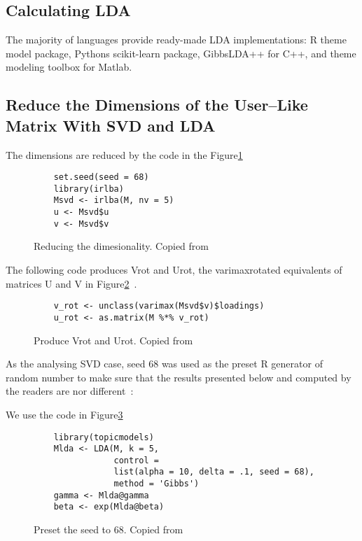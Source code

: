 \subsection{Calculating LDA~\cite{hid515-12}}

The majority of languages provide ready-made LDA implementations: 
R theme model package, Pythons scikit-learn package, 
GibbsLDA++ for C++, and theme modeling toolbox for Matlab.

\subsection{Reduce the Dimensions of the
User–Like Matrix With SVD and LDA~\cite{hid515-12}}

The dimensions are reduced by the code in the Figure\ref{F:reduce}

\begin{figure}[htb]
\begin{footnotesize}
\begin{verbatim}
    set.seed(seed = 68)
    library(irlba)
    Msvd <- irlba(M, nv = 5)
    u <- Msvd$u
    v <- Msvd$v
\end{verbatim}
\end{footnotesize}
\caption{Reducing the dimesionality. Copied from~\cite{hid515-12}}
\label{F:reduce}
\end{figure}


The following code produces Vrot and Urot, the varimaxrotated
equivalents of matrices U and V in Figure\ref{F:produce}~\cite{hid515-12}.

\begin{figure}[htb]
\begin{footnotesize}
\begin{verbatim}
    v_rot <- unclass(varimax(Msvd$v)$loadings)
    u_rot <- as.matrix(M %*% v_rot)
\end{verbatim}
\end{footnotesize}
\caption{Produce Vrot and Urot. Copied from~\cite{hid515-12}}
\label{F:produce}
\end{figure}


As the analysing SVD case, seed 68 was used as the preset
 R generator of random number to make sure that the results 
presented below and computed by the readers are nor 
different~\cite{hid515-12}:

We use the code in Figure\ref{F:setting68}

\begin{figure}[htb]
\begin{footnotesize}
\begin{verbatim}
    library(topicmodels)
    Mlda <- LDA(M, k = 5, 
                control = 
                list(alpha = 10, delta = .1, seed = 68), 
                method = 'Gibbs')
    gamma <- Mlda@gamma
    beta <- exp(Mlda@beta)
\end{verbatim}
\end{footnotesize}
\caption{Preset the seed to 68. Copied from~\cite{hid515-12}}
\label{F:setting68}
\end{figure}



